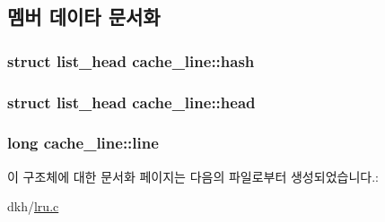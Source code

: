 \subsection{멤버 데이타 문서화}
\hypertarget{structcache__line_a5dc1e6d6a7a0162b2db830f7b230abd4}{
\subsubsection[{hash}]{\setlength{\rightskip}{0pt plus 5cm}struct {\bf list\+\_\+head} cache\+\_\+line\+::hash}}\label{structcache__line_a5dc1e6d6a7a0162b2db830f7b230abd4}
\hypertarget{structcache__line_af231d538713478b74fc7811adc00545b}{
\subsubsection[{head}]{\setlength{\rightskip}{0pt plus 5cm}struct {\bf list\+\_\+head} cache\+\_\+line\+::head}}\label{structcache__line_af231d538713478b74fc7811adc00545b}
\hypertarget{structcache__line_a22870a00436e7425597606393d81eb2c}{
\subsubsection[{line}]{\setlength{\rightskip}{0pt plus 5cm}long cache\+\_\+line\+::line}}\label{structcache__line_a22870a00436e7425597606393d81eb2c}


이 구조체에 대한 문서화 페이지는 다음의 파일로부터 생성되었습니다.\+:\begin{DoxyCompactItemize}
\item 
dkh/\hyperlink{lru_8c}{lru.\+c}\end{DoxyCompactItemize}

